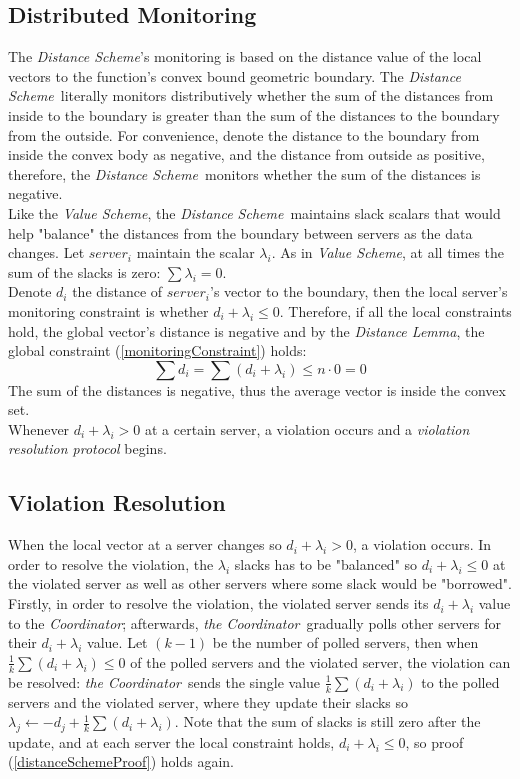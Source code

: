 \documentclass[10pt, conference]{IEEEtran}
\newcommand{\valueScheme}{\textit{Value Scheme}}
\newcommand{\distanceScheme}{\textit{Distance Scheme}}
\newcommand{\distanceLemma}{\textit{Distance Lemma}}
\newcommand{\theCoordinator}{\textit{the Coordinator}}
\newcommand{\Coordinator}{\textit{Coordinator}}
\begin{document}
\subsection{Distributed Monitoring}
The \distanceScheme 's monitoring is based on the distance value of the local vectors to the function's convex bound geometric boundary. The \distanceScheme \ literally monitors distributively whether the sum of the distances from inside to the boundary is greater than the sum of the distances to the boundary from the outside. For convenience, denote the distance to the boundary from inside the convex body as negative, and the distance from outside as positive, therefore, the \distanceScheme \ monitors whether the sum of the distances is negative. \\
Like the \valueScheme , the \distanceScheme \ maintains slack scalars that would help "balance" the distances from the boundary between servers as the data changes. Let $server_i$ maintain the scalar $\lambda _i$. As in \valueScheme , at all times the sum of the slacks is zero: ${\sum {\lambda _i} = 0}$. \\
Denote $d_i$ the distance of $server_i$'s vector to the boundary, then the local server's monitoring constraint is whether ${d_i + \lambda_i \leq 0}$. Therefore, if all the local constraints hold, the global vector's distance is negative and by the \distanceLemma , the global constraint (\ref{monitoringConstraint}) holds:
\begin{equation}
\label{distanceSchemeProof}
\sum{d_i} = \sum{(d_i + \lambda _i)} \leq n \cdot 0 = 0
\end{equation}
The sum of the distances is negative, thus the average vector is inside the convex set. \\
Whenever ${d_i + \lambda _i > 0}$ at a certain server, a violation occurs and a  \textit{violation resolution protocol} begins. 
\subsection{Violation Resolution}
When the local vector at a server changes so ${d_i + \lambda _i > 0}$, a violation occurs. In order to resolve the violation, the $\lambda _i$ slacks has to be "balanced" so ${d_i + \lambda _i \leq 0}$ at the violated server as well as other servers where some slack would be "borrowed". \\
Firstly, in order to resolve the violation, the violated server sends its ${d_i + \lambda _i}$ value to the \Coordinator ; afterwards, \theCoordinator \ gradually polls other servers for their ${d_i + \lambda _i}$ value. Let $(k-1)$ be the number of polled servers, then when ${\frac{1}{k}\sum(d_i + \lambda _i) \leq 0}$ of the polled servers and the violated server, the violation can be resolved: \theCoordinator \ sends the single value ${\frac{1}{k}\sum(d_i + \lambda _i)}$ to the polled servers and the violated server, where they update their slacks so ${\lambda _j 
\leftarrow -d_j + \frac{1}{k}\sum(d_i + \lambda _i)}$. Note that the sum of slacks is still zero after the update, and at each server the local constraint holds, ${d_i + \lambda _i \leq 0}$, so proof (\ref{distanceSchemeProof}) holds again.
\end{document}
